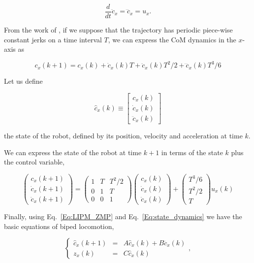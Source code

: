 $$
\dfrac{d}{dt}\ddot{c}_x = \dddot{c}_x= u_x.
$$

From the  work of \citep{Kajita2003}, if we suppose that the trajectory has periodic piece-wise constant jerks on a time interval $T$, we can express the CoM dynamics in the $x$-axis as

$$
c_x(k+1) = c_x(k) + \dot{c}_x(k) T + \ddot{c}_x(k) T^2/2 + \dddot{c}_x(k) T^3/6
$$

Let us define

$$
\hat{c}_x(k) \equiv 
\left[
\begin{matrix}
c_x(k) \\ 
\dot{c}_x(k)\\
\ddot{c}_x(k) 
\end{matrix}
\right]
$$ 

the state of the robot, defined by its position, velocity and acceleration at time $k$. 

We can express the state of the robot at time $k+1$ in terms of the state $k$ plus the control variable,

\begin{equation}
\label{Eq:state_dynamics}
\left(
\begin{matrix}
c_x(k+1) \\ 
\dot{c}_x(k+1)\\
\ddot{c}_x(k+1) 
\end{matrix}
\right) =
\left(
\begin{matrix}
1 & T & T^2/2 \\
0 & 1 & T \\
0 & 0 & 1
\end{matrix}
\right)
\left(
\begin{matrix}
c_x(k) \\ 
\dot{c}_x(k)\\
\ddot{c}_x(k) 
\end{matrix}
\right) +
\left(
\begin{matrix}
T^3/6 \\
T^2/2 \\
T
\end{matrix}
\right)
u_x(k)
\end{equation}

Finally, using Eq.~\ref{Eq:LIPM_ZMP} and Eq.~\ref{Eq:state_dynamics} we have the basic equations of biped locomotion,

\begin{equation}
\label{Eq:basic_dynamic_equations}
\left\{
\begin{array}{ccc}
 \hat{c}_x(k+1) &=&  A \hat{c}_x(k) + B \dddot{c}_x(k)\\
 z_x(k) &=& C \hat{c}_x(k)
\end{array}
\right.,
\end{equation}

